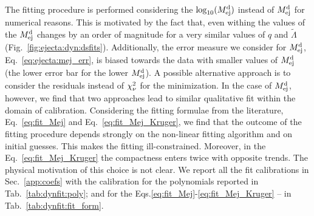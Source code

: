 The fitting procedure is performed considering the $\log_{10}(M^{\text{d}}_{\text{ej}})$ instead of 
$M^{\text{d}}_{\text{ej}}$ for numerical reasons. This is motivated by the fact that, even withing 
\DSrefset{} the values of the $M^{\text{d}}_{\text{ej}}$ changes by an order of magnitude for a very 
similar values of $q$ and $\tilde{\Lambda}$  (Fig.~\ref{fig:ejecta:dyn:dsfits}).
%
Additionally, the error measure we consider for $M^{\text{d}}_{\text{ej}}$, Eq.~\eqref{eq:ejecta:mej_err}, 
is biased towards the data with smaller values of $M^{\text{d}}_{\text{ej}}$ (the lower error bar for the 
lower $M^{\text{d}}_{\text{ej}}$). A possible alternative approach is to consider the residuals instead of 
$\chi_{\nu}^2$ for the minimization. In the case of $M^{\text{d}}_{\text{ej}}$, however, we find that two 
approaches lead to similar qualitative fit within the domain of calibration.
%
%
Considering the fitting formulae from the literature, Eq.~\eqref{eq:fit_Mej} and 
Eq.~\eqref{eq:fit_Mej_Kruger}, we find that the outcome of the fitting procedure depends 
strongly on the non-linear fitting algorithm and on initial guesses. This makes the 
fitting ill-constrained. Moreover, in the Eq.~\eqref{eq:fit_Mej_Kruger} the compactness 
enters twice with opposite trends. The physical motivation of this choice is not clear.
%
We report all the fit calibrations in %
Sec.~\ref{app:coefs}
with the calibration for the polynomials reported in Tab.~\ref{tab:dynfit:poly};
and for the Eqs.\eqref{eq:fit_Mej}-\eqref{eq:fit_Mej_Kruger} -- 
in Tab.~\ref{tab:dynfit:fit_form}.

 

